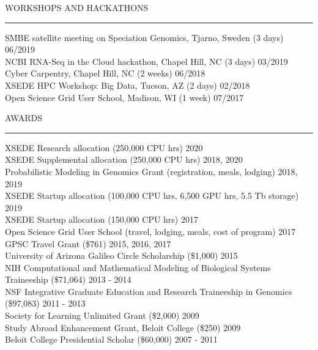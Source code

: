 \documentclass{resume} %
\renewenvironment{rSection}[1]{
\sectionskip
\textcolor{RoyalPurple}{\MakeUppercase{#1}}
\sectionlineskip
\hrule
\begin{list}{}{
\setlength{\leftmargin}{1.5em}
}
\item[]
}{
\end{list}
}
\begin{document}

\newpage
\begin{rSection}{Workshops and Hackathons}

    SMBE satellite meeting on Speciation Genomics, Tjarno, Sweden (3 days) \hfill 06/2019\\
    NCBI RNA-Seq in the Cloud hackathon, Chapel Hill, NC (3 days) \hfill 03/2019\\
    Cyber Carpentry, Chapel Hill, NC (2 weeks) \hfill 06/2018\\
    XSEDE HPC Workshop: Big Data, Tucson, AZ (2 days) \hfill 02/2018\\
    Open Science Grid User School, Madison, WI (1 week) \hfill 07/2017
    
\end{rSection}


\begin{rSection}{Awards}

XSEDE Research allocation (250,000 CPU hrs) \hfill 2020\\
XSEDE Supplemental allocation (250,000 CPU hrs) \hfill 2018, 2020\\
Probabilistic Modeling in Genomics Grant (registration, meals, lodging) \hfill 2018, 2019\\
XSEDE Startup allocation (100,000 CPU hrs, 6,500 GPU hrs, 5.5 Tb storage) \hfill 2019\\
XSEDE Startup allocation (150,000 CPU hrs) \hfill 2017\\
Open Science Grid User School (travel, lodging, meals, cost of program) \hfill 2017\\
GPSC Travel Grant (\$761) \hfill 2015, 2016, 2017 \\
University of Arizona Galileo Circle Scholarship (\$1,000) \hfill 2015 \\
NIH Computational and Mathematical Modeling of Biological Systems Traineeship (\$71,064) \hfill 2013 - 2014\\
NSF Integrative Graduate Education and Research Traineeship in Genomics (\$97,083) \hfill 2011 - 2013\\
Society for Learning Unlimited Grant (\$2,000) \hfill 2009\\
Study Abroad Enhancement Grant, Beloit College (\$250) \hfill 2009\\
Beloit College Presidential Scholar (\$60,000) \hfill 2007 - 2011

\end{rSection}
\end{document}
